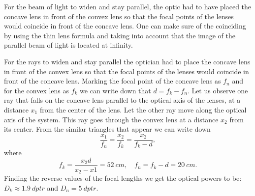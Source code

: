 \hinteng
For the beam of light to widen and stay parallel, the optic had to have placed the concave lens in front of the convex lens so that the focal points of the lenses would coincide in front of the concave lens. One can make sure of the coinciding by using the thin lens formula and taking into account that the image of the parallel beam of light is located at infinity.

\solueng
For the rays to widen and stay parallel the optician had to place the concave lens in front of the convex lens so that the focal points of the lenses would coincide in front of the concave lens. Marking the focal point of the concave lens as $f_{n}$ and for the convex lens as $f_{k}$ we can write down that $d=f_{k}-f_{n}$. Let us observe one ray that falls on the concave lens parallel to the optical axis of the lenses, at a distance $x_{1}$ from the center of the lens. Let the other ray move along the optical axis of the system. This ray goes through the convex lens at a distance $x_{2}$ from its center. From the similar triangles that appear we can write down
\[ \frac{x_{1}}{f_{n}}=\frac{x_{2}}{f_{k}}=\frac{x_{2}}{f_{k}-d}, \] 
where
\[ f_{k}=\frac{x_{2}d}{x_{2}-x{1}}=\SI{52}{cm},\quad  f_{n}=f_{k}-d=\SI{20}{cm}.\] 
Finding the reverse values of the focal lengths we get the optical powers to be: $D_{k}\approx\SI{1,9}{dptr}$ and $D_{n}=\SI{5}{dptr}$.
\probend